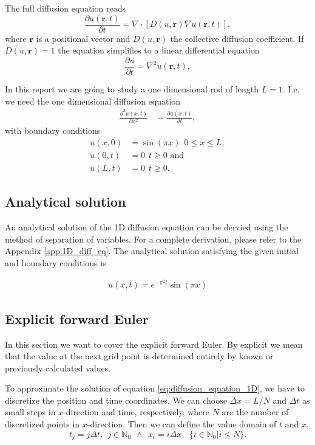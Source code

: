 \documentclass[12pt]{extarticle}
\begin{document}
The full diffusion equation reads
\begin{equation}
\frac{\partial u(\mathbf{r}, t)}{\partial t} = \nabla \cdot \left[D(u, \mathbf{r})\nabla u(\mathbf{r}, t)\right],
\end{equation}
where $\mathbf{r}$ is a positional vector and $D(u,\mathbf{r})$ the collective diffusion coefficient. If $D(u,\mathbf{r}) = 1$ the equation simplifies to a linear differential equation
\begin{equation}
\frac{\partial u}{\partial t} = \nabla^2u(\mathbf{r}, t),
\end{equation}

In this report we are going to study a one dimensional rod of length $L=1$. I.e. we need the one dimensional diffusion equation
\begin{align}
\label{eq:diffusion_equation_1D}
\frac{\partial^2 u(x,t)}{\partial x^2} &= \frac{\partial u(x,t)}{\partial t},
\end{align}
with boundary conditions
\begin{align}
u(x,0) &= \sin(\pi x) \ \ 0\leq x\leq L,\\
u(0,t) &= 0 \ \ t\geq 0 \text{ and} \\
u(L,t) &= 0 \ \ t\geq 0.
\end{align}

\subsection{Analytical solution}


An analytical solution of the 1D diffusion equation can be dervied using the method of separation of variables.
For a complete derivation, please refer to the Appendix \ref{app:1D_diff_eq}.
The analytical solution satisfying the given initial and boundary conditions is

\begin{align} \label{eq:analytical_solution_diffusion}
	u(x,t) = e^{-\pi^2 t} \sin(\pi x)
\end{align}

\subsection{Explicit forward Euler}
In this section we want to cover the explicit forward Euler. By explicit we mean that the value at the next grid point is determined entirely by known or previously calculated values.

To approximate the solution of equation \eqref{eq:diffusion_equation_1D}, we have to discretize the position and time coordinates. We can choose  $\Delta x = L/N$ and $\Delta t$ as small steps in $x$-direction and time, respectively, where $N$ are the number of discretized points in $x$-direction. Then we can define the value domain of $t$ and $x$,
\begin{equation}
t_j = j\Delta t, \ \ j\in \mathbb{N}_0 \ \ \wedge \ \ x_i = i\Delta x, \ \ \{i \in \mathbb{N}_0 | i \leq N\}.
\end{equation}
\end{document}
